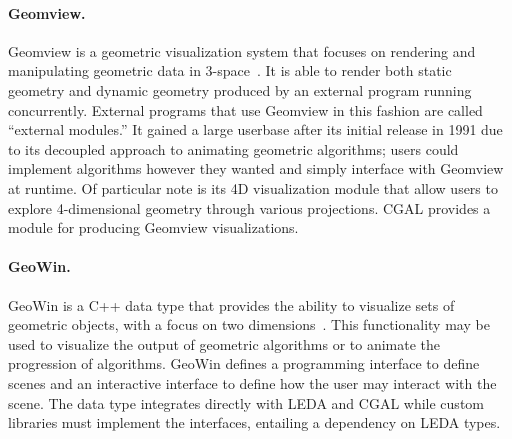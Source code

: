 % 
% 
% 
% 

\paragraph{Geomview.}

Geomview is a geometric visualization system that focuses on rendering and
manipulating geometric data in 3-space~\cite{phillips1993geomview,
hanson1994interactive, amenta1995geomview}. It is able to render both static
geometry and dynamic geometry produced by an external program running
concurrently. External programs that use Geomview in this fashion are called
``external modules.'' It gained a large userbase after its initial release in 1991
due to its decoupled approach to animating geometric algorithms; users could
implement algorithms however they wanted and simply interface with Geomview at
runtime. Of particular note is its 4D visualization module that allow users to
explore 4-dimensional geometry through various projections. CGAL provides a
module for producing Geomview visualizations.

\paragraph{GeoWin.}

GeoWin is a C++ data type that provides the ability to visualize sets of
geometric objects, with a focus on two dimensions~\cite{basken2002geowin}. This
functionality may be used to visualize the output of geometric algorithms or to
animate the progression of algorithms. GeoWin defines a programming interface to
define scenes and an interactive interface to define how the user may interact
with the scene. The data type integrates directly with LEDA and CGAL while
custom libraries must implement the interfaces, entailing a dependency on LEDA
types.

